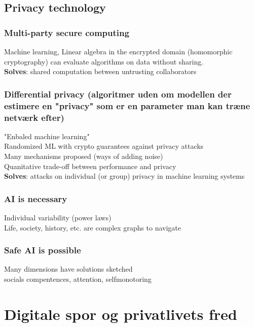 \documentclass[11pt, fleqn]{article}
\begin{document}
	\subsection*{Privacy technology}
	\noindent
	\subsubsection*{Multi-party secure computing} 
	\vspace*{-0.2cm} \noindent
	Machine learning, Linear algebra in the encrypted domain (homomorphic cryptography) can evaluate algorithms on data without sharing. \\ \textbf{Solves}: shared computation between untrusting collaborators \\ 
	
	\subsubsection*{Differential privacy (algoritmer uden om modellen der estimere en "privacy" som er en parameter man kan træne netværk efter)} "Enbaled machine learning" \\
	Randomized ML with crypto guarantees against privacy attacks \\
	Many mechanisms proposed (ways of adding noise) \\
	Quanitative trade-off between performance and privacy \\
	\textbf{Solves}: attacks on individual (or group) privacy in machine learning systems
	
	\subsubsection*{AI is necessary}
	\vspace*{-0.2cm}
	Individual variability (power laws) \\
	Life, society, history, etc. are complex graphs to navigate 
	
	\subsubsection*{Safe AI is possible}
	\vspace*{-0.2cm}
	Many dimensions have solutions sketched \\
	socials compentences, attention, selfmonotoring \\
	
	\section*{Digitale spor og privatlivets fred}
	
\end{document}
